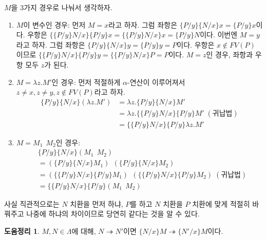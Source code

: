 \documentclass[b5paper, 11pt]{book}
\theoremstyle{definition}
\newtheorem{lem}[defn]{도움정리}
\newenvironment{pf*}{\pushQED{\qed}\pf}
{\popQED\endpf}
\begin{document}
\begin{pf*}
    $M$을 3가지 경우로 나눠서 생각하자.
    \begin{enumerate}
        \item $M$이 변수인 경우: 
        먼저 $M = x$라고 하자. 그럼 좌항은 $\{P / y\} \{ N / x\} x = \{ P / y\} x$이다. 우항은 $\{ \{P / y\} N / x \} \{P / y\} x = \{ \{P / y\} N / x \} x = \{P / y\} N$이다. 이번엔 $M = y$라고 하자. 그럼 좌항은 $\{P / y\} \{ N / x\} y = \{ P / y\} y = P$이다. 우항은 $x \notin FV(P)$ 이므로 $\{ \{P / y\} N / x \} \{P / y\}  y = \{ \{P / y\} N / x \} P = P $이다. $M= z$인 경우, 좌항과 우항 모두 $z$가 된다.
        \item $M = \lambda z. M'$인 경우: 먼저 적절하게 $\alpha$-연산이 이루어져서 $z \neq x, z \neq y, z \notin FV(P)$라고 하자.  
        \begin{align*}
            \{P / y\} \{ N / x\} (\lambda z. M') &= \lambda z. \{P / y\} \{ N / x\}  M' \\ 
            &=  \lambda z. \{ \{P / y\} N / x \} \{P / y \}  M' \; (\text{귀납법})\\ 
            &=   \{ \{P / y\} N / x \} \{P / y \}  \lambda z. M' 
        \end{align*}
        \item $M = M_1 \;\, M_2$인 경우:
        \begin{align*}
            &\{P / y\} \{ N / x\} (M_1 \;\, M_2) \\ 
            & = (\{P / y\} \{ N / x\} M_1 ) \;\, 
            ( \{P / y\} \{ N / x\} M_2) \\
            &= (\{ \{P / y\} N / x \} \{P / y \} M_1) \;\, 
            (\{ \{P / y\} N / x \} \{P / y \} M_2) \; (\text{귀납법}) \\
            &= \{ \{P / y\} N / x \} \{P / y \} (M_1 \;\, M_2)
        \end{align*}
    \end{enumerate}
\end{pf*}
사실 직관적으로는 $N$ 치환을 먼저 하냐, $P$를 하고 $N$ 치환을 $P$ 치환에 맞게 적절히 바꿔주고 나중에 하냐의 차이이므로 당연히 같다는 것을 알 수 있다.
\begin{lem}\label{lem3}
    $M, N \in \Lambda$에 대해, $N \twoheadrightarrow N'$이면 $\{N / x\}M \twoheadrightarrow \{N' / x\}M$이다.
\end{lem}
\end{document}
